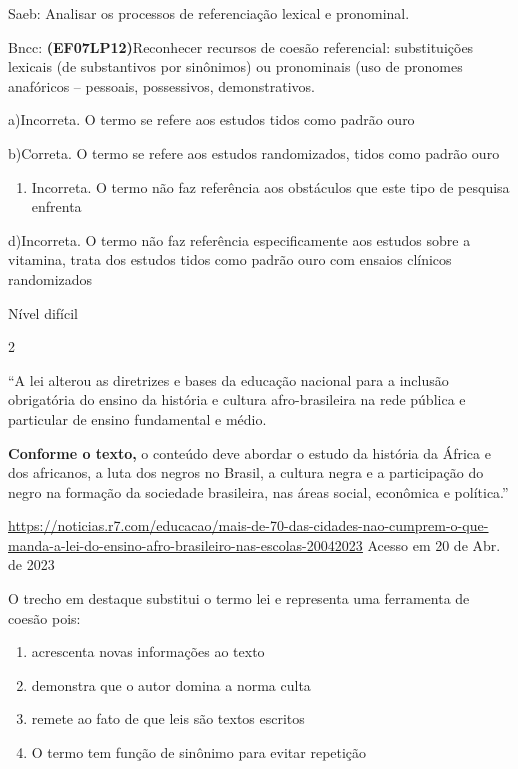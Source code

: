 {{\begin{escolha}
{Saeb: Analisar os processos de referenciação lexical e pronominal.

Bncc: \textbf{(EF07LP12)}Reconhecer recursos de coesão referencial:
substituições lexicais (de substantivos por sinônimos) ou pronominais
(uso de pronomes anafóricos -- pessoais, possessivos, demonstrativos.

a)Incorreta. O termo se refere aos estudos tidos como padrão ouro

b)Correta. O termo se refere aos estudos randomizados, tidos como padrão
ouro

\begin{enumerate}
\def\labelenumi{\arabic{enumi}.}
\tightlist
\item
  Incorreta. O termo não faz referência aos obstáculos que este tipo de
  pesquisa enfrenta
\end{enumerate}

d)Incorreta. O termo não faz referência especificamente aos estudos
sobre a vitamina, trata dos estudos tidos como padrão ouro com ensaios
clínicos randomizados

Nível difícil

\num{2}

``A lei alterou as diretrizes e bases da educação nacional para a
inclusão obrigatória do ensino da história e cultura afro-brasileira na
rede pública e particular de ensino fundamental e médio.

\textbf{Conforme o texto,} o conteúdo deve abordar o estudo da história
da África e dos africanos, a luta dos negros no Brasil, a cultura negra
e a participação do negro na formação da sociedade brasileira, nas áreas
social, econômica e política.''

\href{https://noticias.r7.com/educacao/mais-de-70-das-cidades-nao-cumprem-o-que-manda-a-lei-do-ensino-afro-brasileiro-nas-escolas-20042023}{\uline{https://noticias.r7.com/educacao/mais-de-70-das-cidades-nao-cumprem-o-que-manda-a-lei-do-ensino-afro-brasileiro-nas-escolas-20042023}}
Acesso em 20 de Abr. de 2023

O trecho em destaque substitui o termo lei e representa uma ferramenta
de coesão pois:

\begin{enumerate}
\def\labelenumi{\alph{enumi})}
\item
  acrescenta novas informações ao texto
\item
  demonstra que o autor domina a norma culta
\item
  remete ao fato de que leis são textos escritos
\item
  O termo tem função de sinônimo para evitar repetição
\end{enumerate}

}
\end{escolha}}}
